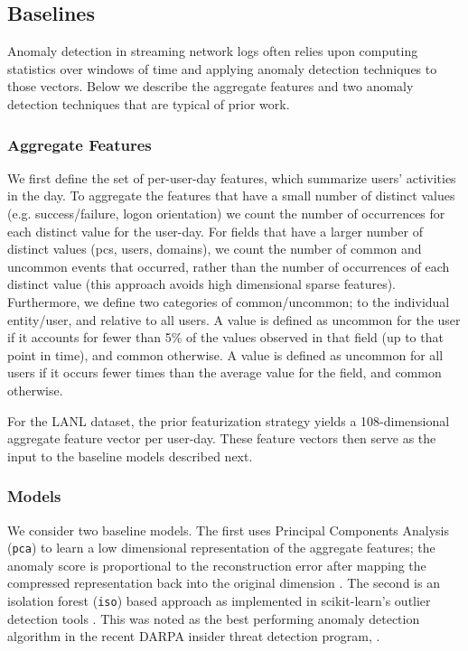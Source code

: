 \documentclass[letterpaper]{article} %
\begin{document}
\subsection{Baselines} \label{subsec:baselines}
Anomaly detection in streaming network logs often relies upon computing statistics over windows of time
and applying anomaly detection techniques to those vectors.  
Below we describe the aggregate features and two anomaly detection techniques that are typical of prior work. 

\subsubsection{Aggregate Features}
We first define the set of per-user-day features, which summarize users' activities in the day.
To aggregate the features that have a small number of distinct values (e.g. success/failure, logon orientation) 
we count the number of occurrences for each distinct value for the user-day. 
For fields that have a larger number of distinct values (pcs, users, domains), we count the number of common and uncommon events that occurred, rather than the number of occurrences of each distinct value (this approach avoids high dimensional sparse features). 
Furthermore, we define two categories of common/uncommon; to the individual entity/user, and relative to all users. 
A value is defined as uncommon for the user if it accounts for fewer than 5\% of the values observed in that field (up to that point in time), and common otherwise. A value is defined as uncommon for all users if it occurs fewer times than the average value for the field, and common otherwise.

For the LANL dataset, the prior featurization strategy yields a 108-dimensional aggregate feature vector per user-day.  
These feature vectors then serve as the input to the baseline models described next.

\subsubsection{Models}
We consider two baseline models.  
The first uses Principal Components Analysis (\verb|pca|) to learn a low dimensional representation of the aggregate features; 
the anomaly score is proportional to the reconstruction error after mapping the compressed representation back into the original dimension \cite{ShyuChenetal03}.  
The second is an isolation forest (\verb|iso|) based approach \cite{LiuTingZhou08}  as implemented in scikit-learn's outlier detection tools \cite{scikit-learn}. This was noted as the best performing anomaly detection algorithm in the recent DARPA insider threat detection program, \cite{gavai2015supervised}.   
\end{document}
